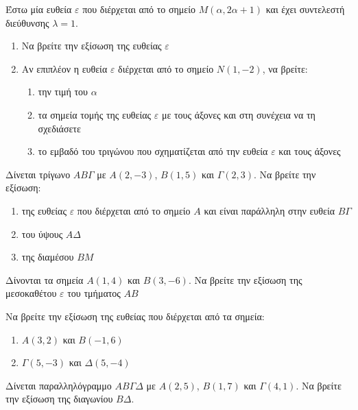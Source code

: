 \documentclass{../../presentation}
\begin{document}
\begin{askisi}
  Έστω μία ευθεία $ε$ που διέρχεται από το σημείο $Μ(α,2α+1)$ και έχει συντελεστή διεύθυνσης $λ=1$.
  \begin{enumerate}[<+->]
    \item Να βρείτε την εξίσωση της ευθείας $ε$
    \item Αν επιπλέον η ευθεία $ε$ διέρχεται από το σημείο $Ν(1,-2)$, να βρείτε:
          \begin{enumerate}[<+(-1)->]
            \item την τιμή του $α$
            \item τα σημεία τομής της ευθείας $ε$ με τους άξονες και στη συνέχεια να τη σχεδιάσετε
            \item το εμβαδό του τριγώνου που σχηματίζεται από την ευθεία $ε$ και τους άξονες
          \end{enumerate}
  \end{enumerate}
\end{askisi}

\begin{askisi}
  Δίνεται τρίγωνο $ΑΒΓ$ με $Α(2,-3)$, $Β(1,5)$ και $Γ(2,3)$. Να βρείτε την εξίσωση:
  \begin{enumerate}[<+->]
    \item της ευθείας $ε$ που διέρχεται από το σημείο $Α$ και είναι παράλληλη στην ευθεία $ΒΓ$
    \item του ύψους $ΑΔ$
    \item της διαμέσου $ΒΜ$
  \end{enumerate}
\end{askisi}

\begin{askisi}
  Δίνονται τα σημεία $Α(1,4)$ και $Β(3,-6)$. Να βρείτε την εξίσωση της μεσοκαθέτου $ε$ του τμήματος $ΑΒ$
\end{askisi}

\begin{askisi}
  Να βρείτε την εξίσωση της ευθείας που διέρχεται από τα σημεία:
  \begin{enumerate}[<+->]
    \item $Α(3,2)$ και $Β(-1,6)$
    \item $Γ(5,-3)$ και $Δ(5,-4)$
  \end{enumerate}
\end{askisi}

\begin{askisi}
  Δίνεται παραλληλόγραμμο $ΑΒΓΔ$ με $Α(2,5)$, $Β(1,7)$ και $Γ(4,1)$. Να βρείτε την εξίσωση της διαγωνίου $ΒΔ$.
\end{askisi}
\end{document}
